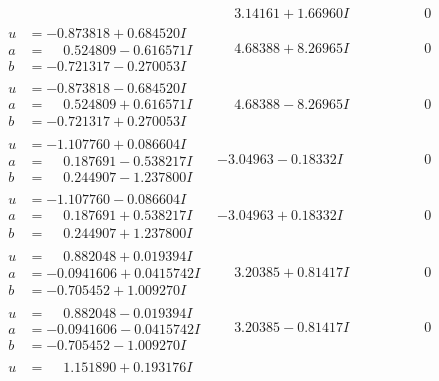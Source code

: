 \documentclass[1p]{elsarticle_modified}
\theoremstyle{definition}
\begin{document}
$$\begin{array}{c|c|c}
 & \phantom{-}3.14161 + 1.66960 I & \phantom{-0.000000 } 0 \\ \hline\begin{aligned}
u &= -0.873818 + 0.684520 I \\
a &= \phantom{-}0.524809 - 0.616571 I \\
b &= -0.721317 - 0.270053 I\end{aligned}
 & \phantom{-}4.68388 + 8.26965 I & \phantom{-0.000000 } 0 \\ \hline\begin{aligned}
u &= -0.873818 - 0.684520 I \\
a &= \phantom{-}0.524809 + 0.616571 I \\
b &= -0.721317 + 0.270053 I\end{aligned}
 & \phantom{-}4.68388 - 8.26965 I & \phantom{-0.000000 } 0 \\ \hline\begin{aligned}
u &= -1.107760 + 0.086604 I \\
a &= \phantom{-}0.187691 - 0.538217 I \\
b &= \phantom{-}0.244907 - 1.237800 I\end{aligned}
 & -3.04963 - 0.18332 I & \phantom{-0.000000 } 0 \\ \hline\begin{aligned}
u &= -1.107760 - 0.086604 I \\
a &= \phantom{-}0.187691 + 0.538217 I \\
b &= \phantom{-}0.244907 + 1.237800 I\end{aligned}
 & -3.04963 + 0.18332 I & \phantom{-0.000000 } 0 \\ \hline\begin{aligned}
u &= \phantom{-}0.882048 + 0.019394 I \\
a &= -0.0941606 + 0.0415742 I \\
b &= -0.705452 + 1.009270 I\end{aligned}
 & \phantom{-}3.20385 + 0.81417 I & \phantom{-0.000000 } 0 \\ \hline\begin{aligned}
u &= \phantom{-}0.882048 - 0.019394 I \\
a &= -0.0941606 - 0.0415742 I \\
b &= -0.705452 - 1.009270 I\end{aligned}
 & \phantom{-}3.20385 - 0.81417 I & \phantom{-0.000000 } 0 \\ \hline\begin{aligned}
u &= \phantom{-}1.151890 + 0.193176 I \\

\end{aligned}
\end{array}$$
\end{document}
